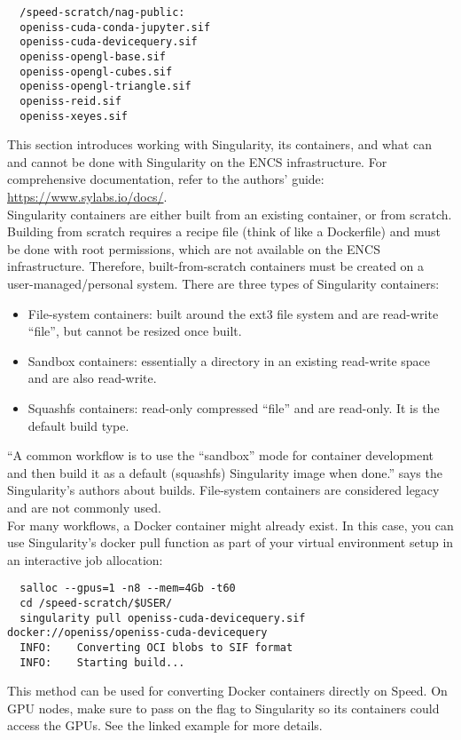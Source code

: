\begin{verbatim}
  /speed-scratch/nag-public:
  openiss-cuda-conda-jupyter.sif
  openiss-cuda-devicequery.sif
  openiss-opengl-base.sif
  openiss-opengl-cubes.sif
  openiss-opengl-triangle.sif
  openiss-reid.sif
  openiss-xeyes.sif
\end{verbatim}

This section introduces working with Singularity, its containers, and what can and cannot 
be done with Singularity on the ENCS infrastructure. For comprehensive documentation, 
refer to the authors' guide: \url{https://www.sylabs.io/docs/}.\\

Singularity containers are either built from an existing container, or from scratch. 
Building from scratch requires a recipe file (think of like a Dockerfile) and
must be done with root permissions, which are not available on the ENCS infrastructure. 
Therefore, built-from-scratch containers must be created on a user-managed/personal system. 
There are three types of Singularity containers:

\begin{itemize}
  \item File-system containers: built around the ext3 file system and are read-write ``file'', but cannot be resized once built.
  \item Sandbox containers: essentially a directory in an existing read-write space and are also read-write.
  \item Squashfs containers: read-only compressed ``file'' and are read-only. It is the default build type.
\end{itemize}

\noindent
``A common workflow is to use the ``sandbox'' mode for container development and then build it as a 
default (squashfs) Singularity image when done.'' says the Singularity's authors about builds.
File-system containers are considered legacy and are not commonly used.\\

For many workflows, a Docker container might already exist. In this case, you can use Singularity's 
docker pull function as part of your virtual environment setup in an interactive job allocation:

\scriptsize
\begin{verbatim}
  salloc --gpus=1 -n8 --mem=4Gb -t60
  cd /speed-scratch/$USER/
  singularity pull openiss-cuda-devicequery.sif docker://openiss/openiss-cuda-devicequery
  INFO:    Converting OCI blobs to SIF format
  INFO:    Starting build...
\end{verbatim}
\normalsize

\noindent
This method can be used for converting Docker containers directly on Speed.
On GPU nodes, make sure to pass on the  flag to Singularity so its containers 
could access the GPUs. See the linked example for more details.
